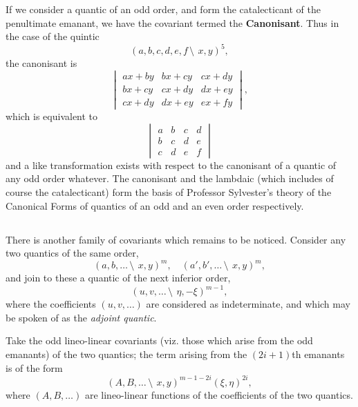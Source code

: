 \documentclass[12pt,a4paper]{article}
\begin{document}
If we consider a quantic of an odd order, and form the catalecticant of the penultimate emanant, we have the covariant termed the \textbf{Canonisant}. Thus in the case of the quintic
\[
(a, b, c, d, e, f\,\setminus\!\!\:\, x, y)^5,
\]
the canonisant is
\[
\begin{vmatrix}
ax + by & bx + cy & cx + dy \\
bx + cy & cx + dy & dx + ey \\
cx + dy & dx + ey & ex + fy
\end{vmatrix},
\]
which is equivalent to
\[
\begin{vmatrix}
a & b & c & d \\
b & c & d & e \\
c & d & e & f
\end{vmatrix}
\]
and a like transformation exists with respect to the canonisant of a quantic of any odd order whatever. The canonisant and the lambdaic (which includes of course the catalecticant) form the basis of Professor Sylvester's theory of the Canonical Forms of quantics of an odd and an even order respectively.

\subsection{}

There is another family of covariants which remains to be noticed. Consider any two quantics of the same order,
\[
(a, b, \ldots \,\setminus\!\!\:\, x, y)^m, \quad (a', b', \ldots \,\setminus\!\!\:\, x, y)^m,
\]
and join to these a quantic of the next inferior order,
\[
(u, v, \ldots \,\setminus\!\!\:\, \eta, -\xi)^{m-1},
\]
where the coefficients $(u, v, \ldots)$ are considered as indeterminate, and which may be spoken of as the \textit{adjoint quantic}.

Take the odd lineo-linear covariants (viz. those which arise from the odd emanants) of the two quantics; the term arising from the $(2i+1)$th emanants is of the form
\[
(A, B, \ldots \,\setminus\!\!\:\, x, y)^{m-1-2i}(\xi, \eta)^{2i},
\]
where $(A, B, \ldots)$ are lineo-linear functions of the coefficients of the two quantics.
\end{document}
